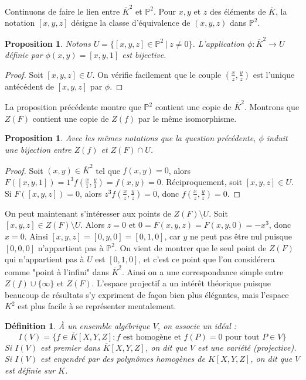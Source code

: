 \documentclass{article}
\theoremstyle{plain}%
\newtheorem{prop}[thm]{Proposition}
\newtheorem{deff}[thm]{Définition}
\theoremstyle{definition}%
\newcommand{\ol}{\overline}
\begin{document}
\vspace{0.5em}

Continuons de faire le lien entre $\ol K^2$ et $\mathbb P^2$. Pour $x, y$ et $z$ des éléments de $\ol K$, la notation $[x, y, z]$ désigne la classe d'équivalence de $(x, y, z)$ dans $\mathbb P^2$.

\begin{prop}
 Notons $U = \{[x, y, z]\in \mathbb P^2\ |\ z\neq 0\}$. L'application $\phi : \ol K^2 \to U$ définie par $\phi(x, y) = [x, y, 1]$ est bijective. 
\end{prop}

\begin{proof}
  Soit $[x, y, z]\in U$. On vérifie facilement que le couple $(\frac{x}{z}, \frac{y}{z})$ est l'unique antécédent de $[x, y, z]$ par $\phi$.
\end{proof}

La proposition précédente montre que $\mathbb P^2$ contient une copie de $\ol K^2$. Montrons que $Z(F )$ contient une copie de $Z(f)$ par le même isomorphisme. 

\begin{prop}
  Avec les mêmes notations que la question précédente, $\phi$ induit une bijection entre $Z(f)$ et $Z(F) \cap U$.
\end{prop}

\begin{proof}
  Soit $(x, y)\in\ol K^2$ tel que $f(x, y) = 0$, alors $F([x, y, 1]) = 1^3f(\frac{x}{1}, \frac{y}{1}) = f(x, y) = 0$.
  Réciproquement, soit $[x, y, z]\in U$. Si $F([x, y, z]) = 0$, alors $z^3f(\frac{x}{z}, \frac{y}{z}) = 0$, donc $f(\frac{x}{z}, \frac{y}{z}) = 0$.
\end{proof}

On peut maintenant s'intéresser aux points de $Z(F)\setminus U$. Soit $[x, y, z]\in Z(F)\setminus U$. Alors $z=0$ et $0 = F(x,y, z) = F(x, y, 0) = -x^3$, donc $x=0$. Ainsi $[x, y, z] = [0, y, 0] = [0, 1, 0]$, car $y$ ne peut pas être nul puisque $[0, 0, 0]$ n'appartient pas à $\mathbb P^2$. On vient de montrer que le seul point de $Z(F)$ qui n'appartient pas à $U$ est $[0, 1, 0]$, et c'est ce point que l'on considérera comme "point à l'infini" dans $\ol K^2$. Ainsi on a une correspondance simple entre $Z(f) \cup \{\infty\}$ et $Z(F)$.
L'espace projectif a un intérêt théorique puisque beaucoup de résultats s'y expriment de façon bien plus élégantes, mais l'espace $K^2$ est plus facile à se représenter mentalement. 

\begin{deff}
  À un ensemble algébrique $V$, on associe un idéal :
  $$I(V) = \{ f\in \overline{K}[X, Y, Z] : f \text{ est homogène et } f(P) = 0 \text{ pour tout } P\in V \}$$
  Si $I(V)$ est premier dans $ \overline{K}[X, Y, Z] $, on dit que $V$ est une variété (projective). Si $I(V)$ est engendré par des polynômes homogènes de $K[X, Y, Z]$, on dit que $V$ est définie sur $K$.  
\end{deff}
\end{document}
